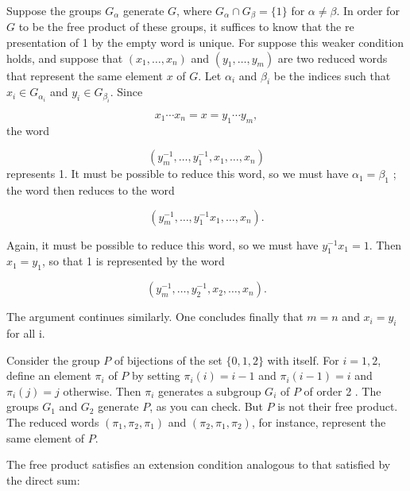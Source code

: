 Suppose the groups \(G_{\alpha }\) generate \(G\), where \(G_{\alpha } \cap {G}_{\beta } = \{ 1\}\) for \(\alpha \neq \beta\). In order for \(G\) to be the free product of these groups, it suffices to know that the re presentation of 1 by the empty word is unique. For suppose this weaker condition holds, and suppose that \(( {x_{1},\ldots ,x_{n}})\) and \(( {y_{1},\ldots ,y_{m}})\) are two reduced words that represent the same element \(x\) of \(G\). Let \({\alpha }_{i}\) and \({\beta }_{i}\) be the indices such that \(x_{i} \in {G}_{{\alpha }_{i}}\) and \(y_{i} \in {G}_{{\beta }_{i}}\). Since

\[
x_{1}\cdots {x}_{n} = x = y_{1}\cdots {y}_{m},
\]
the word

\[
( {y_m^{-1},\ldots ,y_1^{-1},x_{1},\ldots ,x_{n}})
\]
represents 1. It must be possible to reduce this word, so we must have \({\alpha }_{1} = {\beta }_{1}\) ; the word then reduces to the word

\[
( {y_m^{-1},\ldots ,y_1^{-1}x_{1},\ldots ,x_{n}}).
\]

Again, it must be possible to reduce this word, so we must have \(y_1^{-1}x_{1} = 1\). Then \(x_{1} = y_{1}\), so that 1 is represented by the word

\[
( {y_m^{-1},\ldots ,y_2^{-1},x_{2},\ldots ,x_{n}}).
\]

The argument continues similarly. One concludes finally that \(m = n\) and \(x_{i} = y_{i}\) for all i.

\begin{centeredblock}
\begin{example}
\label{ex:\thesection.\theexample}
Consider the group \(P\) of bijections of the set \(\{ 0,1,2\}\) with itself. For \(i = 1,2\), define an element \({\pi }_{i}\) of \(P\) by setting \({\pi }_{i}(i) = i - 1\) and \({\pi }_{i}( {i - 1}) = i\) and \({\pi }_{i}( j) = j\) otherwise. Then \({\pi }_{i}\) generates a subgroup \(G_{i}\) of \(P\) of order 2 . The groups \(G_{1}\) and \(G_{2}\) generate \(P\), as you can check. But \(P\) is not their free product. The reduced words \(( {{\pi }_{1},{\pi }_{2},{\pi }_{1}})\) and \(( {{\pi }_{2},{\pi }_{1},{\pi }_{2}})\), for instance, represent the same element of \(P\).
\end{example}
\end{centeredblock}

The free product satisfies an extension condition analogous to that satisfied by the direct sum:

